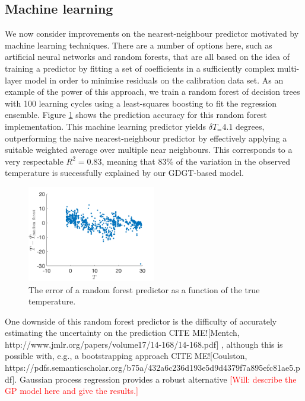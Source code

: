\documentclass[rmp,aps,twocolumn]{revtex4-1}
\newcommand{\todo}[1]{\textcolor{red}{#1}}
\newcommand{\citeme}{{\color{blue} CITE ME!}}
\begin{document}
\subsection{Machine learning}

We now consider improvements on the nearest-neighbour predictor motivated by machine learning techniques.  There are a number of options here, such as artificial neural networks and random forests, that are all based on the idea of training a predictor by fitting a set of coefficients in a sufficiently complex multi-layer model in order to minimise residuals on the calibration data set.  As an example of the power of this approach, we train a random forest of decision trees with 100 learning cycles using a least-squares boosting to fit the regression ensemble.  Figure \ref{fig:randomforest} shows the prediction accuracy for this random forest implementation.  This machine learning predictor yields $\delta T_\mathrm = 4.1$ degrees, outperforming the naive nearest-neighbour predictor by effectively applying a suitable weighted average over multiple near neighbours.  This corresponds to a very respectable $R^2 = 0.83$, meaning that 83\% of the variation in the observed temperature is successfully explained by our GDGT-based model.

\begin{figure}
	\centering
	\includegraphics[width=0.5\textwidth]{Trandomforest.png}
	\caption{\label{fig:randomforest}  The error of a random forest predictor as a function of the true temperature.}
\end{figure}


One downside of this random forest predictor is the difficulty of accurately estimating the uncertainty on the prediction \citeme [Mentch, http://www.jmlr.org/papers/volume17/14-168/14-168.pdf] , although this is possible with, e.g., a bootstrapping approach \citeme [Coulston, https://pdfs.semanticscholar.org/b75a/432a6c236d193e5d9d4379f7a895efc81ae5.pdf].  Gaussian process regression provides a robust alternative 
\todo{[Will: describe the GP model here and give the results.]}
\end{document}
